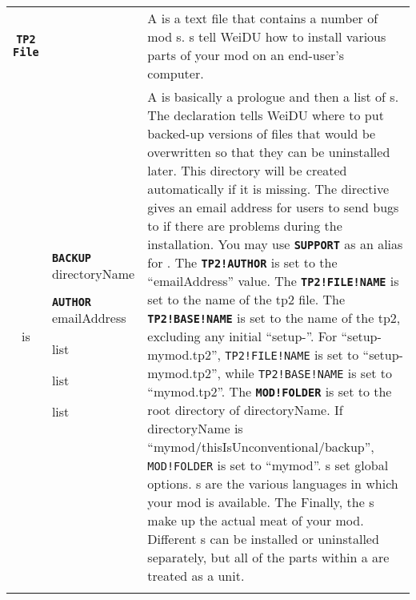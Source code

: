 \documentclass{article}
\def\ttref#1{\ahrefloc{#1}{\tt #1}}
\def\DEFINE#1{{\tt \bf #1}\label{#1}\index{#1}}
\def\t#1{{\tt #1}}
\def\Slist{{\color{red} list }}
\begin{document}
\begin{tabular}{cp{10in}|p{10in}}

\DEFINE{TP2 File} & &
  A \ttref{TP2 File} is a text file that contains a number of
  mod \ttref{Component}s. \ttref{TP2 File}s tell WeiDU how to install
  various parts of your mod on an end-user's computer. \\

  is & \DEFINE{BACKUP} directoryName

       \DEFINE{AUTHOR} emailAddress

       \ttref{TP2 Flag} \Slist

       \ttref{Language} \Slist

       \ttref{Component} \Slist &

       A \ttref{TP2 File} is basically a prologue and then a list of
       \ttref{Component}s. The \ttref{BACKUP} declaration tells WeiDU where
       to put backed-up versions of files that would be overwritten so that
       they can be uninstalled later. This directory will be created
       automatically if it is missing. The \ttref{AUTHOR} directive gives an
       email address for users to send bugs to if there are problems during
       the installation. You may use \DEFINE{SUPPORT} as an alias for
       \ttref{AUTHOR}. The \DEFINE{TP2!AUTHOR} \ttref{variable} is set to
       the ``emailAddress'' value. The \DEFINE{TP2!FILE!NAME} \ttref{variable}
       is set to the name of the tp2 file. The \DEFINE{TP2!BASE!NAME}
       \ttref{variable} is set to the name of the tp2, excluding any initial
       ``setup-''. For ``setup-mymod.tp2'', \t{TP2!FILE!NAME} is set to
       ``setup-mymod.tp2'', while \t{TP2!BASE!NAME} is set to ``mymod.tp2''.
       The \DEFINE{MOD!FOLDER} \ttref{variable} is set to the root directory
       of directoryName. If directoryName is
       ``mymod/thisIsUnconventional/backup'', \t{MOD!FOLDER} is set to
       ``mymod''.
       \ttref{TP2 Flag}s set global options.
       \ttref{Language}s are
       the various languages in which your mod is available. The
       Finally, the \ttref{Component}s make up the actual meat of
       your mod. Different \ttref{Component}s can be installed or
       uninstalled separately, but all of the parts within a
       \ttref{Component} are treated as a unit.  \\
\\


\end{tabular}
\end{document}
